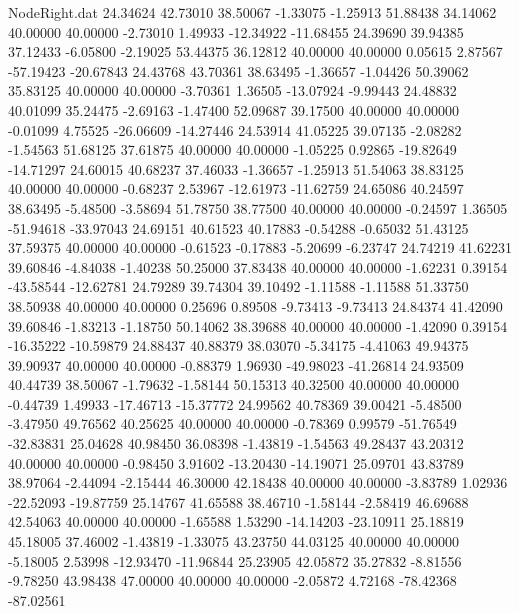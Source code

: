 \begin{filecontents}{NodeRight.dat}
  24.34624   42.73010   38.50067    -1.33075   -1.25913   51.88438   34.14062   40.00000   40.00000   -2.73010    1.49933  -12.34922  -11.68455
  24.39690   39.94385   37.12433    -6.05800   -2.19025   53.44375   36.12812   40.00000   40.00000    0.05615    2.87567  -57.19423  -20.67843
  24.43768   43.70361   38.63495    -1.36657   -1.04426   50.39062   35.83125   40.00000   40.00000   -3.70361    1.36505  -13.07924   -9.99443
  24.48832   40.01099   35.24475    -2.69163   -1.47400   52.09687   39.17500   40.00000   40.00000   -0.01099    4.75525  -26.06609  -14.27446
  24.53914   41.05225   39.07135    -2.08282   -1.54563   51.68125   37.61875   40.00000   40.00000   -1.05225    0.92865  -19.82649  -14.71297
  24.60015   40.68237   37.46033    -1.36657   -1.25913   51.54063   38.83125   40.00000   40.00000   -0.68237    2.53967  -12.61973  -11.62759
  24.65086   40.24597   38.63495    -5.48500   -3.58694   51.78750   38.77500   40.00000   40.00000   -0.24597    1.36505  -51.94618  -33.97043
  24.69151   40.61523   40.17883    -0.54288   -0.65032   51.43125   37.59375   40.00000   40.00000   -0.61523   -0.17883   -5.20699   -6.23747
  24.74219   41.62231   39.60846    -4.84038   -1.40238   50.25000   37.83438   40.00000   40.00000   -1.62231    0.39154  -43.58544  -12.62781
  24.79289   39.74304   39.10492    -1.11588   -1.11588   51.33750   38.50938   40.00000   40.00000    0.25696    0.89508   -9.73413   -9.73413
  24.84374   41.42090   39.60846    -1.83213   -1.18750   50.14062   38.39688   40.00000   40.00000   -1.42090    0.39154  -16.35222  -10.59879
  24.88437   40.88379   38.03070    -5.34175   -4.41063   49.94375   39.90937   40.00000   40.00000   -0.88379    1.96930  -49.98023  -41.26814
  24.93509   40.44739   38.50067    -1.79632   -1.58144   50.15313   40.32500   40.00000   40.00000   -0.44739    1.49933  -17.46713  -15.37772
  24.99562   40.78369   39.00421    -5.48500   -3.47950   49.76562   40.25625   40.00000   40.00000   -0.78369    0.99579  -51.76549  -32.83831
  25.04628   40.98450   36.08398    -1.43819   -1.54563   49.28437   43.20312   40.00000   40.00000   -0.98450    3.91602  -13.20430  -14.19071
  25.09701   43.83789   38.97064    -2.44094   -2.15444   46.30000   42.18438   40.00000   40.00000   -3.83789    1.02936  -22.52093  -19.87759
  25.14767   41.65588   38.46710    -1.58144   -2.58419   46.69688   42.54063   40.00000   40.00000   -1.65588    1.53290  -14.14203  -23.10911
  25.18819   45.18005   37.46002    -1.43819   -1.33075   43.23750   44.03125   40.00000   40.00000   -5.18005    2.53998  -12.93470  -11.96844
  25.23905   42.05872   35.27832    -8.81556   -9.78250   43.98438   47.00000   40.00000   40.00000   -2.05872    4.72168  -78.42368  -87.02561

\end{filecontents}
